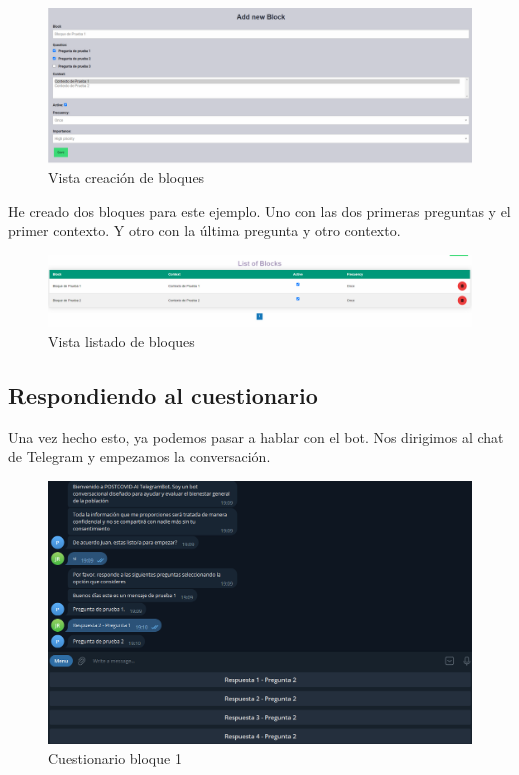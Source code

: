 \begin{figure}[!ht]
    \centering
    \includegraphics[width=1\textwidth]{imagenes/add_bloque_a1.png}
    \caption{ Vista creación de bloques }
    \label{fig:creacion_contexto}
\end{figure}\vspace{0.5cm}

He creado dos bloques para este ejemplo. Uno con las dos primeras preguntas y el primer contexto. Y otro con la última pregunta y otro contexto.  

\begin{figure}[!ht]
    \centering
    \includegraphics[width=1\textwidth]{imagenes/list_bloques_a.png}
    \caption{ Vista listado de bloques }
    \label{fig:creacion_contexto}
\end{figure}


\subsection{Respondiendo al cuestionario}

Una vez hecho esto, ya podemos pasar a hablar con el bot. Nos dirigimos al chat de Telegram y empezamos la conversación. 

\begin{figure}[!ht]
    \centering
    \includegraphics[width=1\textwidth]{imagenes/pregunta_prueba1_a.png}
    \caption{ Cuestionario bloque 1 }
    \label{fig:creacion_contexto}
\end{figure}\vspace{0.5cm}

